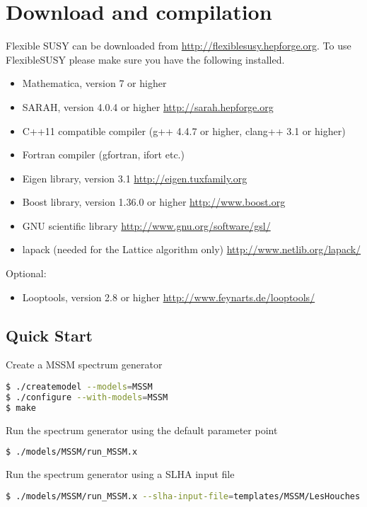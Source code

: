 \documentclass[final,3p,times,pdflatex]{elsarticle}
\begin{document}
\section{Download and compilation}
\label{Sec:download}
Flexible SUSY can be downloaded from \url{http://flexiblesusy.hepforge.org}.  
To use FlexibleSUSY please make sure you have the following installed.  
\begin{itemize}
\item Mathematica, version 7 or higher
\item SARAH, version 4.0.4 or higher \url{http://sarah.hepforge.org}
\item C++11 compatible compiler (g++ 4.4.7 or higher, clang++ 3.1 or
  higher)
\item Fortran compiler (gfortran, ifort etc.)
\item Eigen library, version 3.1 \url{http://eigen.tuxfamily.org}
\item Boost library, version 1.36.0 or higher
  \url{http://www.boost.org}
\item GNU scientific library \url{http://www.gnu.org/software/gsl/}
\item lapack (needed for the Lattice algorithm only)
  \url{http://www.netlib.org/lapack/}
\end{itemize}
%
Optional:
%
\begin{itemize}
\item Looptools, version 2.8 or higher
  \url{http://www.feynarts.de/looptools/}
\end{itemize}

\subsection{Quick Start}
Create a MSSM spectrum generator
  \begin{lstlisting}[language=bash]
$ ./createmodel --models=MSSM
$ ./configure --with-models=MSSM
$ make
  \end{lstlisting}
Run the spectrum generator using the default parameter point
  \begin{lstlisting}[language=bash]
$ ./models/MSSM/run_MSSM.x
  \end{lstlisting}
Run the spectrum generator using a SLHA input file
  \begin{lstlisting}[language=bash]
$ ./models/MSSM/run_MSSM.x --slha-input-file=templates/MSSM/LesHouches.in.MSSM --slha-output-file=LesHouches.out.MSSM
  \end{lstlisting}%
\end{document}
